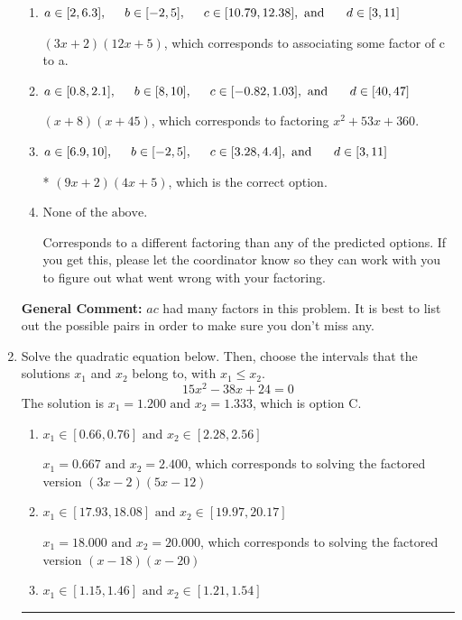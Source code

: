 \documentclass{extbook}[14pt]
\newcommand{\litem}[1]{\item #1

\rule{\textwidth}{0.4pt}}
\begin{document}
\begin{enumerate}
{\begin{enumerate}[label=\Alph*.]
 $(18x + 2)(2x + 5)$, which corresponds to associating some factor of a to c.
\item \( a \in [2, 6.3], \hspace*{5mm} b \in [-2, 5], \hspace*{5mm} c \in [10.79, 12.38], \text{ and } \hspace*{5mm} d \in [3, 11] \)

 $(3x + 2)(12x + 5)$, which corresponds to associating some factor of c to a.
\item \( a \in [0.8, 2.1], \hspace*{5mm} b \in [8, 10], \hspace*{5mm} c \in [-0.82, 1.03], \text{ and } \hspace*{5mm} d \in [40, 47] \)

 $(x + 8)(x + 45)$, which corresponds to factoring $x^{2} +53 x + 360$.
\item \( a \in [6.9, 10], \hspace*{5mm} b \in [-2, 5], \hspace*{5mm} c \in [3.28, 4.4], \text{ and } \hspace*{5mm} d \in [3, 11] \)

* $(9x + 2)(4x + 5)$, which is the correct option.
\item \( \text{None of the above.} \)

 Corresponds to a different factoring than any of the predicted options. If you get this, please let the coordinator know so they can work with you to figure out what went wrong with your factoring.
\end{enumerate}

\textbf{General Comment:} $ac$ had many factors in this problem. It is best to list out the possible pairs in order to make sure you don't miss any.
}
\litem{
Solve the quadratic equation below. Then, choose the intervals that the solutions $x_1$ and $x_2$ belong to, with $x_1 \leq x_2$.
\[ 15x^{2} -38 x + 24 = 0 \]The solution is \( x_1 = 1.200 \text{ and } x_2 = 1.333 \), which is option C.\begin{enumerate}[label=\Alph*.]
\item \( x_1 \in [0.66, 0.76] \text{ and } x_2 \in [2.28, 2.56] \)

$x_1 = 0.667 \text{ and } x_2 = 2.400$, which corresponds to solving the factored version $(3x -2)(5x -12)$
\item \( x_1 \in [17.93, 18.08] \text{ and } x_2 \in [19.97, 20.17] \)

$x_1 = 18.000 \text{ and } x_2 = 20.000$, which corresponds to solving the factored version $(x -18)(x -20)$
\item \( x_1 \in [1.15, 1.46] \text{ and } x_2 \in [1.21, 1.54] \)


\end{enumerate}}
\end{enumerate}
\end{document}
